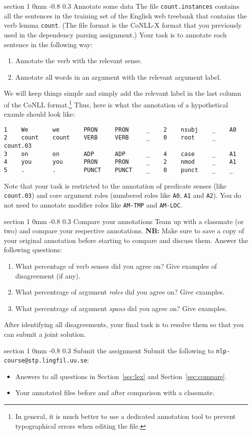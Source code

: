 \documentclass[11pt]{article}
\makeatletter
\newcommand{\newsec}[2]{\section{#1}\label{sec:#2}\noindent}
\renewcommand{\section}{\@startsection
{section}%
{1}%
{0mm}%
{-0.8\baselineskip}%
{0.3\baselineskip}%
{\bfseries\large}}%
\makeatother
\begin{document}
\newsec{Annotate some data}{annotate}%
The file {\tt count.instances} contains all the sentences in the training set of the English web treebank that
contains the verb lemma {\tt count}. (The file format is the CoNLL-X format that you previously used in the
dependency parsing assignment.) Your task is to annotate each sentence in the following way:
\begin{enumerate}[noitemsep,topsep=0.2cm]
\item Annotate the verb with the relevant sense.
\item Annotate all words in an argument with the relevant argument label.
\end{enumerate}
We will keep things simple and simply add the relevant label 
in the last column of the CoNLL format.\footnote{In general, it is much better to use a dedicated annotation
tool to prevent typographical errors when editing the file.}
Thus, here is what the annotation of a hypothetical examle should look like:
\begin{Verbatim}[fontsize=\small,xleftmargin=\parindent]
1    We       we       PRON     PRON     _    2    nsubj    _    A0
2    count    count    VERB     VERB     _    0    root     _    count.03
3    on       on       ADP      ADP      _    4    case     _    A1
4    you      you      PRON     PRON     _    2    nmod     _    A1
5    .        .        PUNCT    PUNCT    _    0    punct    _    _
\end{Verbatim}
Note that your task is restricted to the annotation of predicate senses (like {\tt count.03}) and core
argument roles (numbered roles like {\tt A0}, {\tt A1} and {\tt A2}). You do not need to annotate modifier
roles like {\tt AM-TMP} and {\tt AM-LOC}.

\newsec{Compare your annotations}{compare}%
Team up with a classmate (or two) and compare your respective annotations. {\bf NB:} Make sure 
to save a copy of your original annotation before starting to compare and discuss them.
Answer the following questions:
\begin{enumerate}[noitemsep,topsep=0.2cm]
\item What percentage of verb senses did you agree on? Give examples of disagreement (if any).
\item What percentrage of argument {\em roles} did you agree on? Give examples.
\item What percentrage of argument {\em spans} did you agree on? Give examples.
\end{enumerate}
After identifying all disagreements, your final task is to resolve them so that
you can submit a joint solution.

\newsec{Submit the assignment}{submit}%
Submit the following to {\tt nlp-course@stp.lingfil.uu.se}: 
\begin{itemize}[noitemsep,topsep=0.2cm]
\item Answers to all questions in Section~\ref{sec:lex} and Section~\ref{sec:compare}.
\item Your annotated files before and after comparison with a classmate.
\end{itemize}
\end{document}
